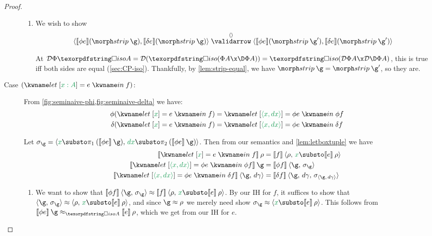 \documentclass{rntz}\usepackage{fantasy}%
\begin{document}
\begin{proof}
\begin{description}
\begin{enumerate}
    \item We wish to show
      \[\vld{\tuple{}}
            {\tuple{\den{\phi e}(\strip\<\g), \den{\delta e}(\strip\<\g)}}
            {\tuple{\den{\phi e}(\strip\<\g'), \den{\delta e}(\strip\<\g')}}
       \]

      At $\incdens{\Phi{\isof A}} = \incden{\isof{(\Phi A \x \DP A)}} =
      \isof{(\incdens{\Phi A} \x \incdens{\DP A})}$, this is true iff both sides
      are equal (\cref{sec:CP-iso}). Thankfully, by \cref{lem:strip-equal}, we
      have $\strip\<\g = \strip\<\g'$, so they are.
    \end{enumerate}

  \item[Case \((\elet{\eboxd {x : A} = e} f)\):] From
    \cref{fig:seminaive-phi,fig:seminaive-delta} we have:
    \begin{align*}
      \phi(\elet{\eboxd x = e} f) &= \elet{\eboxd{\etuple{x,\dx}} = \phi e} \phi f\\
      \delta(\elet{\eboxd x = e} f) &= \elet{\eboxd{\etuple{x,\dx}} = \phi e} \delta f
    \end{align*}

    \noindent
    Let \(\sigma_\g = \tuple{ \dvar x \substo \pi_1 \<(\den{\phi e}\<\g),\,
      \dvar \dx \substo \pi_2 \<(\den{\phi e}\<\g)}\). Then from our semantics
    and \cref{lem:letboxtuple} we have
    \begin{align*}
      \den{\elet{\eboxd x = e} f} \<\rho
      &= \den{f} \<\extend{\rho}{\dvar x \substo \den{e}\<\rho}
      \\
      \den{\elet{\eboxd{\etuple{x,\dx}} = \phi e} \phi f}\<\g
      &= \den{\phi f} \<\extend{\g}{\sigma_\g}
      \\
      \den{\elet{\eboxd{\etuple{x,\dx}} = \phi e} \delta f}\<\extend{\g}{\dgamma}
      &= \den{\delta f} \<\extend{\g,\,\dgamma}{\sigma_{\extend{\g}{\dgamma}}}
    \end{align*}

    \begin{enumerate}
    \item We want to show that
      \(
      \den{\phi f} \<\extend{\g}{\sigma_\g}
      \approx
      \den{f} \<\extend{\rho}{\dvar x \substo \den{e}\<\rho}
      \).
%
      By our IH for $f$, it suffices to show that $\extend{\g}{\sigma_\g}
      \approx \extend{\rho}{\dvar x \substo \den{e}\<\rho}$, and since $\g
      \approx \rho$ we merely need show $\sigma_\g \approx \tuple{\dvar x
        \substo \den{e}\<\rho}$. This follows from $\den{\phi e}\<\g
      \approx_{\isof A} \den{e}\<\rho$, which we get from our IH for $e$.


\end{enumerate}
\end{description}
\end{proof}
\end{document}
